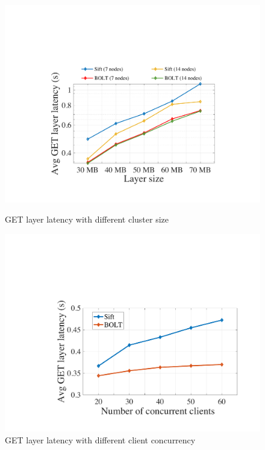 \begin{figure}[t]
	\centering
	\begin{minipage}{0.3\textwidth}
		\centering
		\includegraphics[width=\textwidth]{graphs/clusterscale.pdf}
		\caption{GET layer latency with different cluster size}
		\label{fig:eval-clusterscale}
	\end{minipage}%
	\hspace{1mm}
		\begin{minipage}{0.3\textwidth}
		\centering
		\includegraphics[width=\textwidth]{graphs/clientscale.pdf}
		\caption{GET layer latency with different client concurrency}
		\label{fig:eval-clientscale}
	\end{minipage}%

\end{figure}
